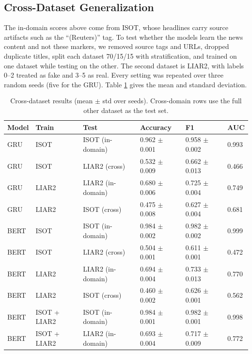 \subsection{Cross-Dataset Generalization}
The in-domain scores above come from ISOT, whose headlines carry source artifacts such as the ``(Reuters)'' tag. To test whether the models learn the news content and not these markers, we removed source tags and URLs, dropped duplicate titles, split each dataset 70/15/15 with stratification, and trained on one dataset while testing on the other. The second dataset is LIAR2, with labels 0--2 treated as fake and 3--5 as real. Every setting was repeated over three random seeds (five for the GRU). Table \ref{tab:cross-dataset} gives the mean and standard deviation.

\begin{table}[htbp]
\centering
\caption{Cross-dataset results (mean $\pm$ std over seeds). Cross-domain rows use the full other dataset as the test set.}
\label{tab:cross-dataset}
\begin{tabular}{llllll}
\hline
Model & Train & Test & Accuracy & F1 & AUC \\
\hline
GRU & ISOT & ISOT (in-domain) & 0.962 $\pm$ 0.001 & 0.958 $\pm$ 0.002 & 0.993 \\
GRU & ISOT & LIAR2 (cross) & 0.532 $\pm$ 0.009 & 0.662 $\pm$ 0.013 & 0.466 \\
GRU & LIAR2 & LIAR2 (in-domain) & 0.680 $\pm$ 0.006 & 0.725 $\pm$ 0.004 & 0.749 \\
GRU & LIAR2 & ISOT (cross) & 0.475 $\pm$ 0.008 & 0.627 $\pm$ 0.004 & 0.681 \\
BERT & ISOT & ISOT (in-domain) & 0.984 $\pm$ 0.002 & 0.982 $\pm$ 0.002 & 0.999 \\
BERT & ISOT & LIAR2 (cross) & 0.504 $\pm$ 0.001 & 0.611 $\pm$ 0.001 & 0.472 \\
BERT & LIAR2 & LIAR2 (in-domain) & 0.694 $\pm$ 0.004 & 0.733 $\pm$ 0.013 & 0.770 \\
BERT & LIAR2 & ISOT (cross) & 0.460 $\pm$ 0.002 & 0.626 $\pm$ 0.001 & 0.562 \\
BERT & ISOT + LIAR2 & ISOT (in-domain) & 0.984 $\pm$ 0.001 & 0.982 $\pm$ 0.001 & 0.998 \\
BERT & ISOT + LIAR2 & LIAR2 (in-domain) & 0.693 $\pm$ 0.004 & 0.717 $\pm$ 0.009 & 0.772 \\
\hline
\end{tabular}
\end{table}

